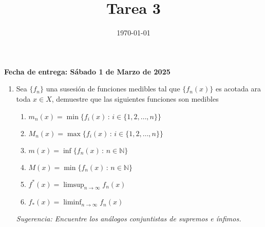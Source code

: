 \documentclass[letterpaper]{article}
\date{\today}
\title{Tarea 3}
\newcommand{\nat}{\ensuremath{ \mathbb N }}
\begin{document}
\maketitle

\textbf{Fecha de entrega: Sábado 1 de Marzo de 2025}

\begin{enumerate}
\item Sea $\{f_n\}$ una susesión de funciones medibles tal que $\{f_n(x)\}$ es acotada ara toda $x\in X$, demuestre que las siguientes funciones son medibles
\begin{enumerate}
\item $m_n(x)=\min\{f_i(x)\,:\,i\in\{1,2,\dots,n\}\}$
\item $M_n(x)=\max\{f_i(x)\,:\,i\in\{1,2,\dots,n\}\}$
\item $m(x)=\inf\{f_n(x)\,:\,n\in\nat\}$
\item $M(x)=\min\{f_n(x)\,:\,n\in\nat\}$
\item $f^{*}(x)=\limsup_{n\to\infty}f_n(x)$
\item $f_*(x)=\liminf_{n\to\infty}f_n(x)$
\end{enumerate}
\emph{Sugerencia: Encuentre los análogos conjuntistas de supremos e ínfimos.}


\end{enumerate}
\end{document}
